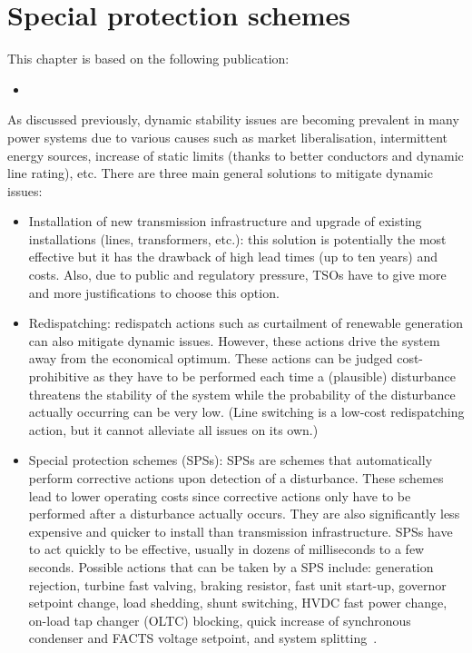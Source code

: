 \chapter{Special protection schemes}
\label{ch:SPS}

This chapter is based on the following publication:
\begin{itemize}
    \item {}
\end{itemize}

As discussed previously, dynamic stability issues are becoming prevalent in many power systems due to various causes such as market liberalisation, intermittent energy sources, increase of static limits (thanks to better conductors and dynamic line rating), etc. There are three main general solutions to mitigate dynamic issues:

\begin{itemize}
    \item Installation of new transmission infrastructure and upgrade of existing installations (lines, transformers, etc.): this solution is potentially the most effective but it has the drawback of high lead times (up to ten years) and costs. Also, due to public and regulatory pressure, TSOs have to give more and more justifications to choose this option.
    \item Redispatching: redispatch actions such as curtailment of renewable generation can also mitigate dynamic issues. However, these actions drive the system away from the economical optimum. These actions can be judged cost-prohibitive as they have to be performed each time a (plausible) disturbance threatens the stability of the system while the probability of the disturbance actually occurring can be very low. (Line switching is a low-cost redispatching action, but it cannot alleviate all issues on its own.)
    \item Special protection schemes (SPSs): SPSs are schemes that automatically perform corrective actions upon detection of a disturbance. These schemes lead to lower operating costs since corrective actions only have to be performed after a disturbance actually occurs. They are also significantly less expensive and quicker to install than transmission infrastructure. SPSs have to act quickly to be effective, usually in dozens of milliseconds to a few seconds. Possible actions that can be taken by a SPS include: generation rejection, turbine fast valving, braking resistor, fast unit start-up, governor setpoint change, load shedding, shunt switching, HVDC fast power change, on-load tap changer (OLTC) blocking, quick increase of synchronous condenser and FACTS voltage setpoint, and system splitting~\cite{CigreDefensePlan}.
\end{itemize}

